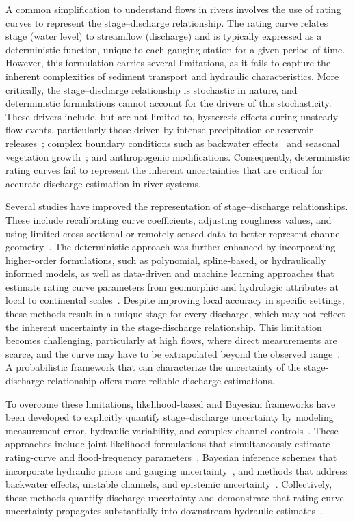 \documentclass[11pt]{article}
\begin{document}
A common simplification to understand flows in rivers involves the use of rating curves to represent the stage--discharge relationship. The rating curve relates stage (water level) to streamflow (discharge) and is typically expressed as a deterministic function, unique to each gauging station for a given period of time. However, this formulation carries several limitations, as it fails to capture the inherent complexities of sediment transport and hydraulic characteristics. More critically, the stage--discharge relationship is stochastic in nature, and deterministic formulations cannot account for the drivers of this stochasticity. These drivers include, but are not limited to, hysteresis effects during unsteady flow events, particularly those driven by intense precipitation or reservoir releases~\cite{perret2022, fread1975}; complex boundary conditions such as backwater effects~\cite{hidayat2011} and seasonal vegetation growth~\cite{perret2021}; and anthropogenic modifications. Consequently, deterministic rating curves fail to represent the inherent uncertainties that are critical for accurate discharge estimation in river systems.

Several studies have improved the representation of stage--discharge relationships. These include recalibrating curve coefficients, adjusting roughness values, and using limited cross-sectional or remotely sensed data to better represent channel geometry~\cite{Singh2010, Barbetta2012, Pan2016}. The deterministic approach was further enhanced by incorporating higher-order formulations, such as polynomial, spline-based, or hydraulically informed models, as well as data-driven and machine learning approaches that estimate rating curve parameters from geomorphic and hydrologic attributes at local to continental scales~\cite{Fenton2018, Lee2021, Pati2023, chang2023, Baruah2025}. Despite improving local accuracy in specific settings, these methods result in a unique stage for every discharge, which may not reflect the inherent uncertainty in the stage-discharge relationship. This limitation becomes challenging, particularly at high flows, where direct measurements are scarce, and the curve may have to be extrapolated beyond the observed range~\cite{petersen2009}. A probabilistic framework that can characterize the uncertainty of the stage-discharge relationship offers more reliable discharge estimations.

To overcome these limitations, likelihood-based and Bayesian frameworks have been developed to explicitly quantify stage–discharge uncertainty by modeling measurement error, hydraulic variability, and complex channel controls~\cite{lecoz2014, mansanarez2016, mansanarez2019, ocio2017}. These approaches include joint likelihood formulations that simultaneously estimate rating-curve and flood-frequency parameters~\cite{petersen2009}, Bayesian inference schemes that incorporate hydraulic priors and gauging uncertainty~\cite{lecoz2014}, and methods that address backwater effects, unstable channels, and epistemic uncertainty~\cite{mansanarez2016, mansanarez2019, westerberg2015, reitan2008}. Collectively, these methods quantify discharge uncertainty and demonstrate that rating-curve uncertainty propagates substantially into downstream hydraulic estimates~\cite{petersen2009, ocio2017}.
\end{document}
